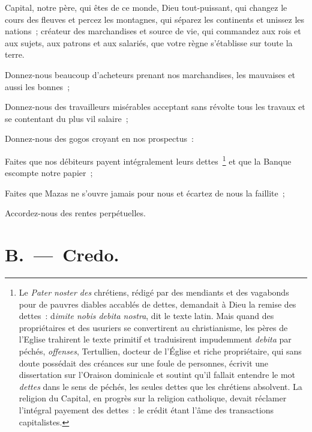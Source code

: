 \documentclass[french,twoside]{book} %
\begin{document}
\noindent Capital, notre père, qui êtes de ce monde, Dieu tout-puissant, qui changez le cours des fleuves et percez les montagnes, qui séparez les continents et unissez les nations ; créateur des marchandises et source de vie, qui commandez aux rois et aux sujets, aux patrons et aux salariés, que votre règne s’établisse sur toute la terre.\par
Donnez-nous beaucoup d’acheteurs prenant nos marchandises, les mauvaises et aussi les bonnes ;\par
Donnez-nous des travailleurs misérables acceptant sans révolte tous les travaux et se contentant du plus vil salaire ;\par
Donnez-nous des gogos croyant en nos prospectus :\par
Faites que nos débiteurs payent intégralement leurs dettes \footnote{Le \emph{Pater noster des} chrétiens, rédigé par des mendiants et des vagabonds pour de pauvres diables accablés de dettes, demandait à Dieu la remise des dettes : d\emph{imite nobis debita nostra}, dit le texte latin. Mais quand des propriétaires et des usuriers se convertirent au christianisme, les pères de l’Eglise trahirent le texte primitif et traduisirent impudemment \emph{debita} par péchés, \emph{offenses}, Tertullien, docteur de l’Église et riche propriétaire, qui sans doute possédait des créances sur une foule de personnes, écrivit une dissertation sur l’Oraison dominicale et soutint qu’il fallait entendre le mot \emph{dettes} dans le sens de péchés, les seules dettes que les chrétiens absolvent. La religion du Capital, en progrès sur la religion catholique, devait réclamer l’intégral payement des dettes : le crédit étant l’âme des transactions capitalistes.} et que la Banque escompte notre papier ;\par
Faites que Mazas ne s’ouvre jamais pour nous et écartez de nous la faillite ;\par
Accordez-nous des rentes perpétuelles.\par

\begin{center}
\end{center}


\section[{B. — Credo.}]{B. — Credo.}
\end{document}
